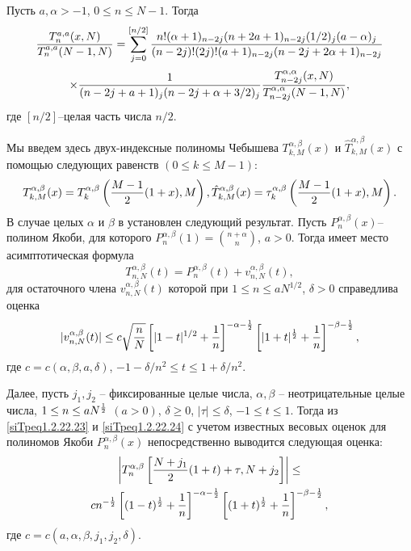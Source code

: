 Пусть $a,\alpha>-1$, $0\le n\le N-1$. Тогда \cite{idprm39}
$$
{T_n^{a,a}(x,N)\over T_n^{a,a}(N-1,N)}=\sum_{j=0}^{[n/2]}
{n!(\alpha+1)_{n-2j}(n+2a+1)_{n-2j}(1/2)_j(a-\alpha)_j
\over (n-2j)!(2j)!(a+1)_{n-2j}(n-2j+2\alpha+1)_{n-2j}}$$
\begin{equation}\label{siTpeq1.2.22.21}
 \times{1\over (n-2j+a+1)_j(n-2j+\alpha+3/2)_j}
  {T_{n-2j}^{\alpha,\alpha}(x,N)\over
T_{n-2j}^{\alpha,\alpha}(N-1,N)},
    \end{equation}
  где $[n/2]$--целая часть числа $n/2$.


Мы введем здесь двух-индексные полиномы Чебышева
$T_{k,M}^{\alpha,\beta}(x)$ и $\hat T_{k,M}^{\alpha,\beta}(x)$  с
помощью следующих равенств $(0\le k\le M-1)$:
\begin{equation}\label{siTpeq1.2.22.22}
T_{k,M}^{\alpha,\beta}(x)=T_k^{\alpha,\beta}\left({M-1\over2}(1+x),M\right),
\hat T_{k,M}^{\alpha,\beta}(x)=\tau_k^{\alpha,\beta}\left({M-1\over2}(1+x),M\right).
\end{equation}
 В случае целых $\alpha$ и $\beta$ в \cite{idprmasympPropsAndWeightEst, idprmasympProps, idprmasympCheb} установлен
следующий результат. Пусть $P_n^{\alpha,\beta}(x)$-- полином Якоби,
для которого $P_n^{\alpha,\beta}(1)={n+\alpha\choose n }$,
  $a>0$. Тогда имеет место асимптотическая формула
\begin{equation}\label{siTpeq1.2.22.23}
 T_{n,N}^{\alpha,\beta}(t)= P_n^{\alpha,\beta}(t)+ v_{n,N}^{\alpha,\beta}(t),
\end{equation}
 для остаточного члена $v_{n,N}^{\alpha,\beta}(t)$
 которой при $1\le n\le aN^{1/2}$, $\delta>0$ справедлива оценка
\begin{equation}\label{siTpeq1.2.22.24} |v_{n,N}^{\alpha,\beta}(t)|  \le c \sqrt{n\over N} \left[|1-t|^{1/2}+{1\over
n}\right]^{-\alpha-{1\over2}} \left[|1+t|^{{1\over2}}+{1\over
n}\right]^{-\beta-{1\over2}},
\end{equation}
где
$c=c(\alpha,\beta,a,\delta)$, $-1-\delta/ n^2\le t\le 1+\delta/
n^2$.

Далее, пусть $j_1,j_2$ -- фиксированные целые
числа, $\alpha,\beta$ -- неотрицательные целые числа, $1\le n\le
aN^{{1\over2}}$ $(a>0)$, $\delta\ge0$, $|\tau|\le\delta$, $-1\le t
\le1$.  Тогда из \eqref{siTpeq1.2.22.23} и \eqref{siTpeq1.2.22.24} с учетом известных весовых оценок
для полиномов Якоби $P_n^{\alpha,\beta}(x)$ непосредственно
выводится следующая оценка:
\begin{multline}\label{siTpeq1.2.22.25}
\left|T_n^{\alpha,\beta}\left[{N+j_1\over2}(1+t)+\tau,
N+j_2\right]\right|  \le \\
cn^{-{1\over2}}\left[(1-t)^{{1\over2}}+{1\over
n}\right]^{-\alpha-{1\over2}} \left[(1+t)^{1\over2}+{1\over
n}\right]^{-\beta-{1\over2}},
\end{multline}
 где $c=c(a,\alpha,\beta,j_1,j_2,\delta)$.

